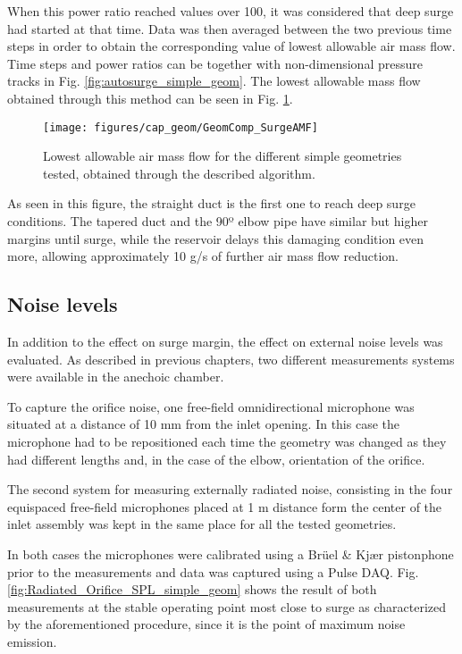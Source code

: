 When this power ratio reached values over 100, it was considered that deep surge had started at that time. Data was then averaged between the two previous time steps in order to obtain the corresponding value of lowest allowable air mass flow. Time steps and power ratios can be together with non-dimensional pressure tracks in Fig. \ref{fig:autosurge_simple_geom}. The lowest allowable mass flow obtained through this method can be seen in Fig. \ref{fig:minFlow_simple_geom}.

\begin{figure}[h!]
\centering
\texttt{[image: figures/cap\_geom/GeomComp\_SurgeAMF]}
\caption{Lowest allowable air mass flow for the different simple geometries tested, obtained through the described algorithm.}
\label{fig:minFlow_simple_geom}
\end{figure}

As seen in this figure, the straight duct is the first one to reach  deep surge conditions. The tapered duct and the 90º elbow pipe have similar but higher margins until surge, while the reservoir delays this damaging condition even more, allowing approximately 10 g/s of further air mass flow reduction.

\subsection{Noise levels}

In addition to the effect on surge margin, the effect on external noise levels was evaluated. As described in previous chapters, two different measurements systems were available in the anechoic chamber. 

To capture the orifice noise, one free-field omnidirectional microphone was situated at a distance of 10 mm from the inlet opening. In this case the microphone had to be repositioned each time the geometry was changed as they had different lengths and, in the case of the elbow, orientation of the orifice.

The second system for measuring externally radiated noise, consisting in the four equispaced free-field microphones placed at 1 m distance form the center of the inlet assembly was kept in the same place for all the tested geometries. 

In both cases the microphones were calibrated using a Brüel \& Kj\ae r pistonphone prior to the measurements and data was captured using a Pulse DAQ. Fig. \ref{fig:Radiated_Orifice_SPL_simple_geom} shows the result of both measurements at the stable operating point most close to surge as characterized by the aforementioned procedure, since it is the point of maximum noise emission.

